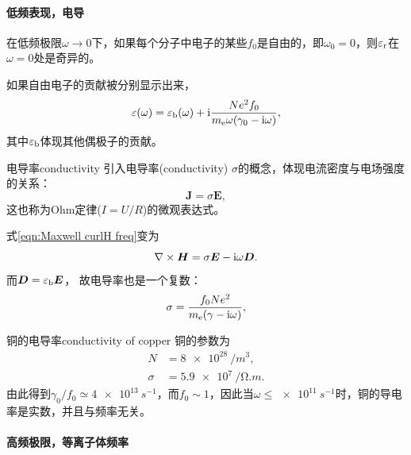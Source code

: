 \paragraph{低频表现，电导}

在低频极限$\omega\to0$下，如果每个分子中电子的某些$f_0$是自由的，即$\omega_0=0$，则$\varepsilon_\text r$在$\omega=0$处是奇异的。

如果自由电子的贡献被分别显示出来，
\[
    \varepsilon(\omega)=\varepsilon_\text b(\omega)+\mathrm{i}\frac{Ne^2f_0}{m_\mathrm e\omega(\gamma_0-\mathrm{i}\omega)},
\]
其中$\varepsilon_\text b$体现其他偶极子的贡献。

\begin{definition}{电导率}{conductivity}
    引入电导率(conductivity) $\sigma$的概念，体现电流密度与电场强度的关系：
    \begin{equation}
        \bm J=\sigma\bm E,
    \end{equation}
    这也称为Ohm定律($I=U/R$)的微观表达式。
\end{definition}
式\eqref{eqn:Maxwell curlH freq}变为
\[
    \nabla\times\bm H=\sigma\bm E-\mathrm{i}\omega\bm D.
\]
而$\bm D=\varepsilon_\text b\bm E$，
故电导率也是一个复数：
\begin{equation}
    \sigma=\frac{f_0Ne^2}{m_\mathrm e(\gamma-\mathrm{i}\omega)},
\end{equation} 
\begin{example}{铜的电导率}{conductivity of copper}
    铜的参数为
    \begin{align*}
        N&=\SI{8e28}{/m^3},\\
        \sigma&=\SI{5.9e7}{/\ohm.m}.
    \end{align*}
    由此得到$\gamma_0/f_0\simeq\SI{4e13}{s^{-1}}$，而$f_0\sim 1$，因此当$\omega\leqslant\SI{e11}{s^{-1}}$时，铜的导电率是实数，并且与频率无关。
\end{example}

\paragraph{高频极限，等离子体频率}

